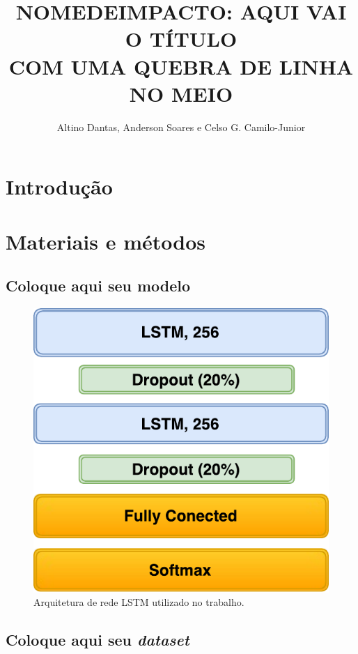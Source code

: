 \documentclass[isoft]{ufgposter}
\title{\uppercase{NomeDeImpacto: Aqui vai o título \\ com uma quebra de linha no meio}}
\author{Altino Dantas, Anderson Soares e Celso G. Camilo-Junior}
\begin{document}
\begin{poster}


\section{Introdução}

\lipsum[3-4]

\section{Materiais e métodos}%

\subsection{Coloque aqui seu modelo}

\lipsum[11]

\vspace{1cm}

\begin{figure}
\centering
\captionsetup{type=figure}
\includegraphics[scale=2]{lstm}
\caption{Arquitetura de rede LSTM utilizado no trabalho.}
\label{fig:lstm}
\end{figure}

\subsection{Coloque aqui seu \textit{dataset}}


\end{poster}
\end{document}
